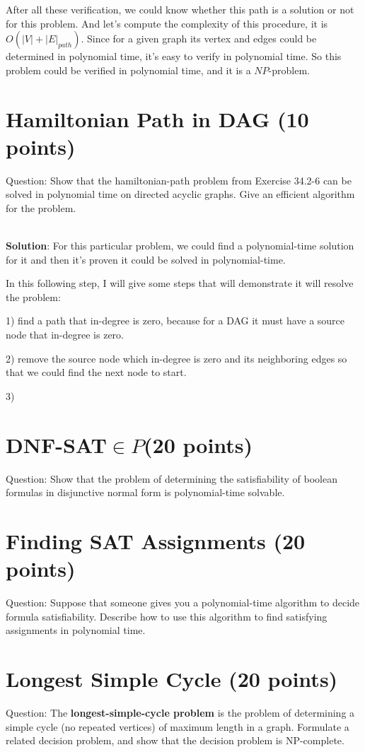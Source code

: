 \documentclass{article}
\begin{document}
After all these verification, we could know whether this path is a solution or not for this problem. And let's compute the complexity of this procedure, it is \boldmath\underline{{$O(|V| + |E|_{path})$}}\unboldmath. Since for a given graph its vertex and edges could be determined in polynomial time, it's easy to verify in polynomial time. So this problem could be verified in polynomial time, and it is a $NP$-problem.


\section{Hamiltonian Path in DAG (10 points)}
Question: Show that the hamiltonian-path problem from Exercise 34.2-6 can be solved in polynomial time on directed acyclic graphs. Give an efficient algorithm for the problem.

~\\
\textbf{Solution}:\newline
For this particular problem, we could find a polynomial-time solution for it and then it's proven it could be solved in polynomial-time.

In this following step, I will give some steps that will demonstrate it will resolve the problem:

1) find a path that in-degree is zero, because for a DAG it must have a source node that in-degree is zero.

2) remove the source node which in-degree is zero and its neighboring edges so that we could find the next node to start.

3)



\section{DNF-SAT$\in{P}$(20 points)}
Question: Show that the problem of determining the satisfiability of boolean formulas in disjunctive normal form is polynomial-time solvable.


\section{Finding SAT Assignments (20 points)}
Question: Suppose that someone gives you a polynomial-time algorithm to decide formula satisfiability. Describe how to use this algorithm to find satisfying assignments in polynomial time.


\section{Longest Simple Cycle (20 points)}
Question: The \textbf{longest-simple-cycle problem} is the problem of determining a simple cycle (no repeated vertices) of maximum length in a graph. Formulate a related decision problem, and show that the decision problem is NP-complete.
\end{document}
